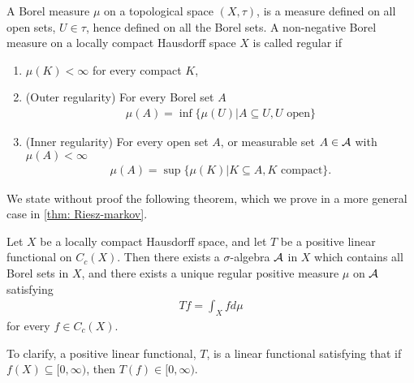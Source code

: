 \begin{definition}\label{def: regular}
A Borel measure $\mu$ on a topological space $(X, \tau)$, is a measure defined on all open sets, $U\in \tau$, hence defined on all the Borel sets. A non-negative Borel measure on a locally compact Hausdorff space $X$ is called regular if
\begin{enumerate}
\item $\mu(K)<\infty$ for every compact $K$,
\item (Outer regularity) For every Borel set $A$
\begin{align*}
	\mu(A)=\inf\{ \mu(U) | A\subseteq U, U \text{ open} \}
\end{align*}
\item (Inner regularity) For every open set $A$, or measurable set $A\in \mathcal{A}$ with $\mu(A)<\infty$
\begin{align*}
	\mu(A)=\sup\{ \mu(K) | K\subseteq A, K \text{ compact} \}.
\end{align*}
\end{enumerate}
\end{definition}

We state without proof the following theorem, which we prove in a more general case in \cref{thm: Riesz-markov}.

\begin{theorem}\label{thm: Riesz-Markov-Kakutani representation theorem}
Let $X$ be a locally compact Hausdorff space, and let $T$ be a positive linear functional on $C_{c}(X)$. Then there exists a $\sigma$-algebra $\mathcal{A}$ in $X$ which contains all Borel sets in $X$, and there exists a unique regular positive measure $\mu$ on $\mathcal{A}$ satisfying
\begin{align*}
	Tf=\int_{X}fd\mu
\end{align*}
for every $f\in C_{c}(X)$.
\end{theorem}

To clarify, a positive linear functional, $T$, is a linear functional satisfying that if $f(X)\subseteq [0,\infty)$, then $T(f)\in [0,\infty)$.



